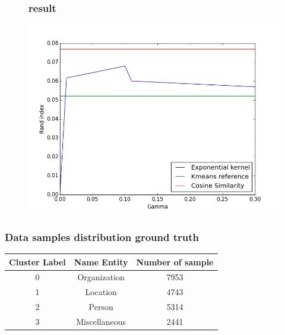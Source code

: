 \documentclass{beamer}
\begin{document}
\begin{frame}
\begin{figure}
\frametitle{result}
\includegraphics[width=0.8\linewidth]{../REPORT/results.png}  
\end{figure}
\end{frame}

\begin{frame}
\frametitle{Data samples distribution ground truth}
\begin{center}
\begin{tabular}{ |c|c|c|} 
\hline
Cluster Label & Name Entity & Number of sample\\
\hline
0 & Organization & 7953\\
 \hline
1 & Location & 4743\\
 \hline
2 & Person & 5314\\
 \hline
3 & Miscellaneous & 2441\\
 \hline
\end{tabular}
\end{center}
\end{frame}
\end{document}
